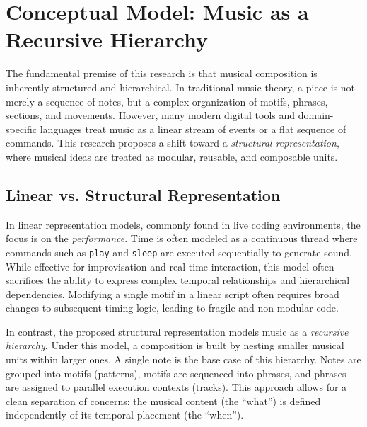 

\section{Conceptual Model: Music as a Recursive Hierarchy}\label{detail-sec:conceptual-model}

The fundamental premise of this research is that musical composition is inherently structured and hierarchical.
In traditional music theory, a piece is not merely a sequence of notes, but a complex organization of motifs, phrases,
sections, and movements.
However, many modern digital tools and domain-specific languages treat music as a linear stream of events or a flat
sequence of commands.
This research proposes a shift toward a \textit{structural representation}, where musical ideas are treated as modular,
reusable, and composable units.

\subsection{Linear vs. Structural Representation}\label{detail-subsec:linear-vs.-structural-representation}

In linear representation models, commonly found in live coding environments, the focus is on the \textit{performance}.
Time is often modeled as a continuous thread where commands such as \texttt{play} and \texttt{sleep} are executed
sequentially to generate sound.
While effective for improvisation and real-time interaction, this model often sacrifices the ability to express complex
temporal relationships and hierarchical dependencies.
Modifying a single motif in a linear script often requires broad changes to subsequent timing logic, leading to fragile
and non-modular code.

In contrast, the proposed structural representation models music as a \textit{recursive hierarchy}.
Under this model, a composition is built by nesting smaller musical units within larger ones.
A single note is the base case of this hierarchy.
Notes are grouped into motifs (patterns), motifs are sequenced into phrases, and phrases are assigned to parallel
execution contexts (tracks).
This approach allows for a clean separation of concerns: the musical content (the ``what'') is defined independently of
its temporal placement (the ``when'').

